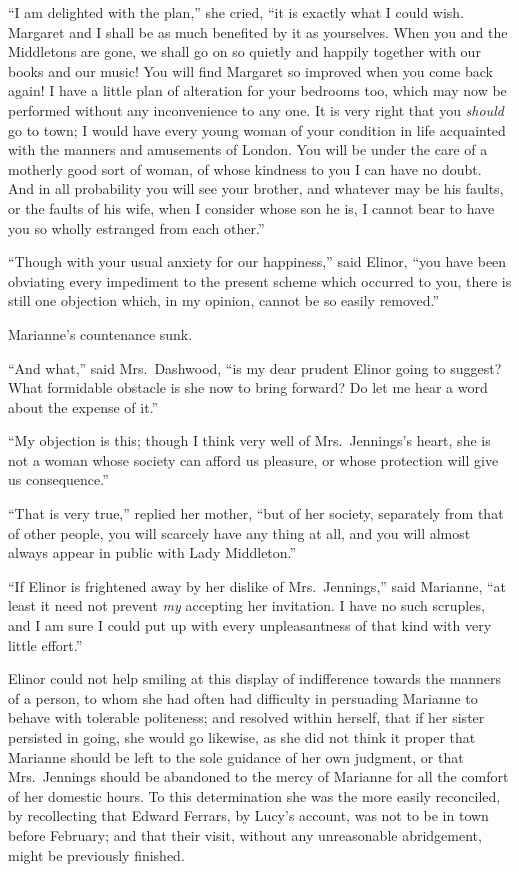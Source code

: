 ``I am delighted with the plan,'' she cried,
``it is exactly what I could wish.  Margaret and I shall
be as much benefited by it as yourselves.  When you
and the Middletons are gone, we shall go on so quietly
and happily together with our books and our music! You
will find Margaret so improved when you come back again!
I have a little plan of alteration for your bedrooms too,
which may now be performed without any inconvenience
to any one.  It is very right that you \emph{should} go to town;
I would have every young woman of your condition in life
acquainted with the manners and amusements of London.
You will be under the care of a motherly good sort
of woman, of whose kindness to you I can have no doubt.
And in all probability you will see your brother,
and whatever may be his faults, or the faults of his wife,
when I consider whose son he is, I cannot bear to have you so
wholly estranged from each other.''

``Though with your usual anxiety for our happiness,''
said Elinor, ``you have been obviating every impediment
to the present scheme which occurred to you, there is
still one objection which, in my opinion, cannot be so
easily removed.''

Marianne's countenance sunk.

``And what,'' said Mrs.\ Dashwood, ``is my dear prudent
Elinor going to suggest?  What formidable obstacle is she
now to bring forward?  Do let me hear a word about the
expense of it.''

``My objection is this; though I think very well of
Mrs.\ Jennings's heart, she is not a woman whose society
can afford us pleasure, or whose protection will give
us consequence.''

``That is very true,'' replied her mother, ``but of
her society, separately from that of other people,
you will scarcely have any thing at all, and you will
almost always appear in public with Lady Middleton.''

``If Elinor is frightened away by her dislike of
Mrs.\ Jennings,'' said Marianne, ``at least it need not prevent
\emph{my} accepting her invitation.  I have no such scruples,
and I am sure I could put up with every unpleasantness
of that kind with very little effort.''

Elinor could not help smiling at this display of
indifference towards the manners of a person, to whom she
had often had difficulty in persuading Marianne to behave
with tolerable politeness; and resolved within herself,
that if her sister persisted in going, she would
go likewise, as she did not think it proper that Marianne
should be left to the sole guidance of her own judgment,
or that Mrs.\ Jennings should be abandoned to the mercy
of Marianne for all the comfort of her domestic hours.
To this determination she was the more easily reconciled,
by recollecting that Edward Ferrars, by Lucy's account,
was not to be in town before February; and that
their visit, without any unreasonable abridgement,
might be previously finished.

